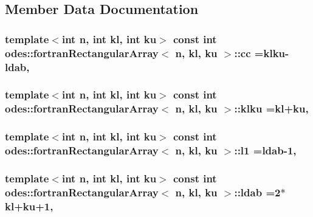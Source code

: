 \subsection{Member Data Documentation}
\hypertarget{classodes_1_1fortranRectangularArray_a7a59fad036a553bc9f65842637465cad}{
\subsubsection[{cc}]{\setlength{\rightskip}{0pt plus 5cm}template$<$int n, int kl, int ku$>$ const int {\bf odes\-::fortran\-Rectangular\-Array}$<$ n, kl, ku $>$\-::cc ={\bf klku}-\/{\bf ldab}\hspace{0.3cm}{\ttfamily [static]}, {\ttfamily [private]}}}\label{classodes_1_1fortranRectangularArray_a7a59fad036a553bc9f65842637465cad}
\hypertarget{classodes_1_1fortranRectangularArray_afdc8eca52742d938bbe7670769c33818}{
\subsubsection[{klku}]{\setlength{\rightskip}{0pt plus 5cm}template$<$int n, int kl, int ku$>$ const int {\bf odes\-::fortran\-Rectangular\-Array}$<$ n, kl, ku $>$\-::klku =kl+ku\hspace{0.3cm}{\ttfamily [static]}, {\ttfamily [private]}}}\label{classodes_1_1fortranRectangularArray_afdc8eca52742d938bbe7670769c33818}
\hypertarget{classodes_1_1fortranRectangularArray_ad1d9e54651da99373857744ddfae77a6}{
\subsubsection[{l1}]{\setlength{\rightskip}{0pt plus 5cm}template$<$int n, int kl, int ku$>$ const int {\bf odes\-::fortran\-Rectangular\-Array}$<$ n, kl, ku $>$\-::l1 ={\bf ldab}-\/1\hspace{0.3cm}{\ttfamily [static]}, {\ttfamily [private]}}}\label{classodes_1_1fortranRectangularArray_ad1d9e54651da99373857744ddfae77a6}
\hypertarget{classodes_1_1fortranRectangularArray_a71e7e0def95610ca1a1bc4c00e65b3cf}{
\subsubsection[{ldab}]{\setlength{\rightskip}{0pt plus 5cm}template$<$int n, int kl, int ku$>$ const int {\bf odes\-::fortran\-Rectangular\-Array}$<$ n, kl, ku $>$\-::ldab =2$\ast$kl+ku+1\hspace{0.3cm}{\ttfamily [static]}, {\ttfamily [private]}}}\label{classodes_1_1fortranRectangularArray_a71e7e0def95610ca1a1bc4c00e65b3cf}
